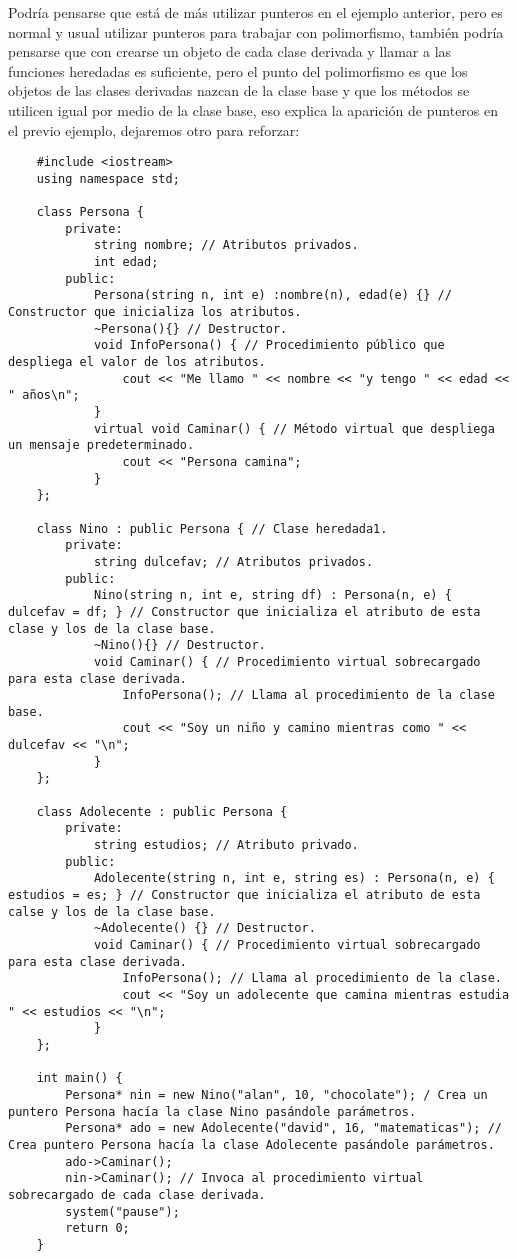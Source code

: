 Podría pensarse que está de más utilizar punteros en el ejemplo anterior, pero es normal y usual utilizar punteros para trabajar con polimorfismo, también podría pensarse que con crearse un objeto de cada clase derivada y llamar a las funciones heredadas es suficiente, pero el punto del polimorfismo es que los objetos de las clases derivadas nazcan de la clase base y que los métodos se utilicen igual por medio de la clase base, eso explica la aparición de punteros en el previo ejemplo, dejaremos otro para reforzar:
\begin{lstlisting}
    #include <iostream>
    using namespace std;
    
    class Persona {
        private:
            string nombre; // Atributos privados.
            int edad;
        public:
            Persona(string n, int e) :nombre(n), edad(e) {} // Constructor que inicializa los atributos.
            ~Persona(){} // Destructor.
            void InfoPersona() { // Procedimiento público que despliega el valor de los atributos.
                cout << "Me llamo " << nombre << "y tengo " << edad << " años\n";
            }
            virtual void Caminar() { // Método virtual que despliega un mensaje predeterminado.
                cout << "Persona camina";
            }
    };

    class Nino : public Persona { // Clase heredada1.
        private:
            string dulcefav; // Atributos privados.
        public:
            Nino(string n, int e, string df) : Persona(n, e) { dulcefav = df; } // Constructor que inicializa el atributo de esta clase y los de la clase base.
            ~Nino(){} // Destructor.
            void Caminar() { // Procedimiento virtual sobrecargado para esta clase derivada.
                InfoPersona(); // Llama al procedimiento de la clase base.
                cout << "Soy un niño y camino mientras como " << dulcefav << "\n";
            }
    };

    class Adolecente : public Persona {
        private:
            string estudios; // Atributo privado.
        public:
            Adolecente(string n, int e, string es) : Persona(n, e) { estudios = es; } // Constructor que inicializa el atributo de esta calse y los de la clase base.
            ~Adolecente() {} // Destructor.
            void Caminar() { // Procedimiento virtual sobrecargado para esta clase derivada.
                InfoPersona(); // Llama al procedimiento de la clase.
                cout << "Soy un adolecente que camina mientras estudia " << estudios << "\n";
            }
    };

    int main() {
        Persona* nin = new Nino("alan", 10, "chocolate"); / Crea un puntero Persona hacía la clase Nino pasándole parámetros.
        Persona* ado = new Adolecente("david", 16, "matematicas"); // Crea puntero Persona hacía la clase Adolecente pasándole parámetros.
        ado->Caminar();
        nin->Caminar(); // Invoca al procedimiento virtual sobrecargado de cada clase derivada.
        system("pause");
        return 0;
    }
\end{lstlisting}


